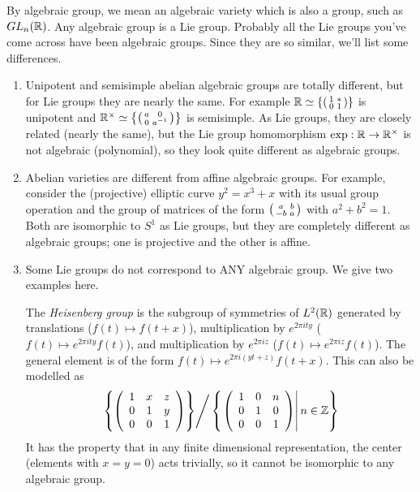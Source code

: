  By algebraic group, we mean an algebraic variety which is also a group, such as
 $GL_n(\mathbb{R})$. Any algebraic group is a Lie group. Probably all the Lie groups you've
 come across have been algebraic groups. Since they are so similar, we'll list some
 differences.
 \begin{enumerate}
 \item Unipotent and semisimple abelian algebraic groups are totally different, but
 for Lie groups they are nearly the same. For example $\mathbb{R}\simeq
 \left\{\left( \begin{smallmatrix} 1 & \ast \\ 0 & 1 \end{smallmatrix} \right)\right\}$ is unipotent and $\mathbb{R}^\times \simeq
 \left\{\left( \begin{smallmatrix} a & 0 \\ 0 & a^{-1} \end{smallmatrix} \right)\right\}$ is semisimple. As Lie groups, they are closely
 related (nearly the same), but the Lie group homomorphism $\exp: \mathbb{R}\to \mathbb{R}^\times$
 is not algebraic (polynomial), so they look quite different as algebraic groups.

 \item Abelian varieties are different from affine algebraic groups. For example,
 consider the (projective) elliptic curve $y^2=x^3+x$ with its usual group operation
 and the group of matrices of the form $\left( \begin{smallmatrix} a & b \\ -b & a \end{smallmatrix} \right)$ with $a^2+b^2=1$. Both are
 isomorphic to $S^1$ as Lie groups, but they are completely different as algebraic
 groups; one is projective and the other is affine.

 \item Some Lie groups do not correspond to ANY algebraic group. We give two examples
 here.

 The \emph{Heisenberg group} is the subgroup of
 symmetries of $L^2(\mathbb{R})$ generated by translations ($f(t)\mapsto f(t+x)$),
 multiplication by $e^{2\pi ity}$ ($f(t)\mapsto e^{2\pi ity} f(t)$), and
 multiplication by $e^{2\pi iz}$ ($f(t)\mapsto e^{2\pi iz}f(t)$). The general element
 is of the form $f(t)\mapsto e^{2\pi i(yt+z)}f(t+x)$. This can also be modelled as
 \[
 \left.\left\{\left( \begin{array}{cccccccccccccccccccccccccccc} 1 & x & z \\ 0 & 1 & y \\ 0 & 0 & 1 \end{array}\right)\right\}\right/
 \left\{\left.\left( \begin{array}{cccccccccccccccccccccccccccc} 1 & 0 & n \\ 0 & 1 & 0 \\ 0 & 0 & 1 \end{array}\right) \right| n\in \mathbb{Z}\right\}
 \]
 It has the property that in any finite dimensional representation, the center
 (elements with $x=y=0$) acts trivially, so it cannot be isomorphic to any algebraic
 group.


\end{enumerate}
